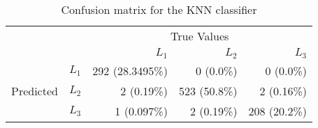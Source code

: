 \begin{table}
  \centering
    \caption{Confusion matrix for the KNN classifier}
    \label{tab:confusion_matrix_knnc}
    \begin{tabular}{rrrrr}
      \toprule
      & &\multicolumn{3}{c}{True Values}\\
      & & ${L_1}$ & ${L_2}$ & ${L_3}$ \\
      \multirow{3}{*}{Predicted} & ${L_1}$ & 292 (28.3495\%) & 0 (0.0\%) & 0 (0.0\%) \\
      & ${L_2}$ & 2 (0.19\%) & 523 (50.8\%) & 2 (0.16\%) \\
      & ${L_3}$ & 1 (0.097\%) & 2 (0.19\%) & 208 (20.2\%) \\\bottomrule
    \end{tabular}
  \end{table}